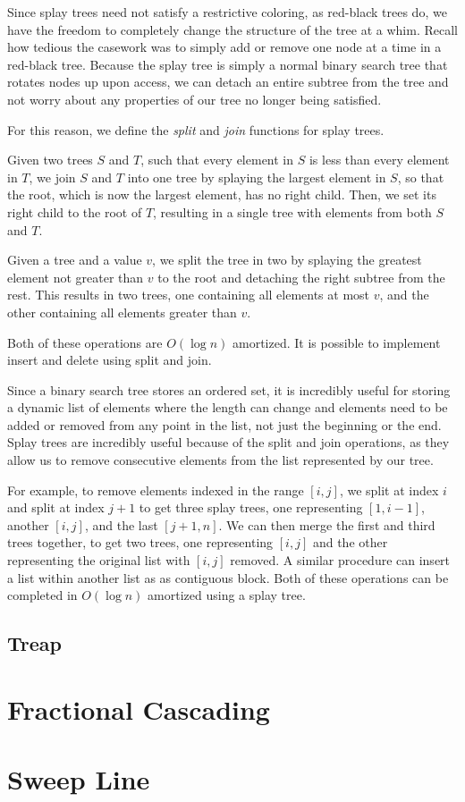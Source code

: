 Since splay trees need not satisfy a restrictive coloring, as red-black trees do, we have the freedom to completely change the structure of the tree at a whim. Recall how tedious the casework was to simply add or remove one node at a time in a red-black tree. Because the splay tree is simply a normal binary search tree that rotates nodes up upon access, we can detach an entire subtree from the tree and not worry about any properties of our tree no longer being satisfied.

For this reason, we define the \textit{split} and \textit{join} functions for splay trees.

Given two trees $S$ and $T$, such that every element in $S$ is less than every element in $T$, we join $S$ and $T$ into one tree by splaying the largest element in $S$, so that the root, which is now the largest element, has no right child. Then, we set its right child to the root of $T$, resulting in a single tree with elements from both $S$ and $T$.

Given a tree and a value $v$, we split the tree in two by splaying the greatest element not greater than $v$ to the root and detaching the right subtree from the rest. This results in two trees, one containing all elements at most $v$, and the other containing all elements greater than $v$.

Both of these operations are $O(\log{n})$ amortized. It is possible to implement insert and delete using split and join.

Since a binary search tree stores an ordered set, it is incredibly useful for storing a dynamic list of elements where the length can change and elements need to be added or removed from any point in the list, not just the beginning or the end. Splay trees are incredibly useful because of the split and join operations, as they allow us to remove consecutive elements from the list represented by our tree.

For example, to remove elements indexed in the range $[i, j]$, we split at index $i$ and split at index $j+1$ to get three splay trees, one representing $[1, i-1]$, another $[i,j]$, and the last $[j+1,n]$. We can then merge the first and third trees together, to get two trees, one representing $[i,j]$ and the other representing the original list with $[i,j]$ removed. A similar procedure can insert a list within another list as as contiguous block. Both of these operations can be completed in $O(\log{n})$ amortized using a splay tree.

\subsection{Treap}

\section{Fractional Cascading}

\section{Sweep Line}